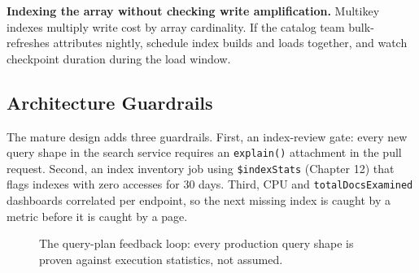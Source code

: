 \begin{pitfall}
\textbf{Indexing the array without checking write amplification.} Multikey indexes multiply write cost by array cardinality. If the catalog team bulk-refreshes attributes nightly, schedule index builds and loads together, and watch checkpoint duration during the load window.
\end{pitfall}

\subsection{Architecture Guardrails}
The mature design adds three guardrails. First, an index-review gate: every new query shape in the search service requires an \texttt{explain()} attachment in the pull request. Second, an index inventory job using \texttt{\$indexStats} (Chapter 12) that flags indexes with zero accesses for 30 days. Third, CPU and \texttt{totalDocsExamined} dashboards correlated per endpoint, so the next missing index is caught by a metric before it is caught by a page.

\begin{figure}[H]
    \centering
    \caption{The query-plan feedback loop: every production query shape is proven against execution statistics, not assumed.}
    \label{fig:ch5-plan-loop}
\end{figure}

